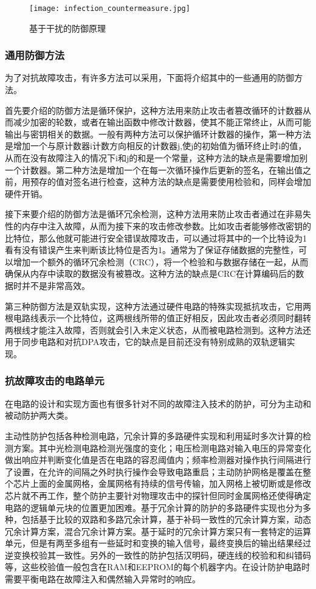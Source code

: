 \documentclass[a4paper,12pt]{article}
\begin{document}
\begin{CJK}{UTF8}{gkai}
\begin{figure}
\centering
\caption{基于干扰的防御原理}
\texttt{[image: infection\_countermeasure.jpg]}
\label{infection_countermeasure}
\end{figure}

\subsubsection{通用防御方法}
为了对抗故障攻击，有许多方法可以采用，下面将介绍其中的一些通用的防御方法。

首先要介绍的防御方法是循环保护，这种方法用来防止攻击者篡改循环的计数器从而减少加密的轮数，或者在输出函数中修改计数器，使其不能正常终止，从而可能输出与密钥相关的数据。一般有两种方法可以保护循环计数器的操作，第一种方法是增加一个与原计数器i计数方向相反的计数器j,使j的初始值为循环终止时i的值，从而在没有故障注入的情况下i和j的和是一个常量，这种方法的缺点是需要增加别一个计数器。第二种方法是增加一个在每一次循环操作后更新的签名，在输出值之前，用预存的值对签名进行检查，这种方法的缺点是需要使用检验和，同样会增加硬件开销。

接下来要介绍的防御方法是循环冗余检测，这种方法用来防止攻击者通过在非易失性的内存中注入故障，从而为接下来的攻击修改参数。比如攻击者能够修改密钥的比特位，那么他就可能进行安全错误故障攻击，可以通过将其中的一个比特设为1看有没有错误产生来判断该比特位是否为1。通常为了保证存储数据的完整性，可以增加一个额外的循环冗余检测（CRC），将一个检验和与数据存储在一起，从而确保从内存中读取的数据没有被篡改。这种方法的缺点是CRC在计算编码后的数据时并不是非常高效。

第三种防御方法是双轨实现，这种方法通过硬件电路的特殊实现抵抗攻击，它用两根电路线表示一个比特位，这两根线所带的值正好相反，因此攻击者必须同时翻转两根线才能注入故障，否则就会引入未定义状态，从而被电路检测到。这种方法还用于同步电路和对抗DPA攻击，它的缺点是目前还没有特别成熟的双轨逻辑实现。



\subsubsection{抗故障攻击的电路单元}
在电路的设计和实现方面也有很多针对不同的故障注入技术的防护，可分为主动和被动防护两大类。

主动性防护包括各种检测电路，冗余计算的多路硬件实现和利用延时多次计算的检测方案。其中光检测电路检测光强度的变化；电压检测电路对输入电压的异常变化做出响应并判断变化值是否在电路的容忍阈值内；频率检测器对操作执行间隔进行了设置，在允许的间隔之外时执行操作会导致电路重启；主动防护网格是覆盖在整个芯片上面的金属网格，金属网格有持续的信号传输，加入网格上被切断或是修改芯片就不再工作，整个防护主要针对物理攻击中的探针但同时金属网格还使得确定电路的逻辑单元块的位置更加困难。基于冗余计算的防护的多路硬件实现也分为多种，包括基于比较的双路和多路冗余计算，基于补码一致性的冗余计算方案，动态冗余计算方案，混合冗余计算方案。基于延时的冗余计算方案只有一套特定的运算单元，但是有两至多组有一些延时和变换的输入信号，最终变换后的输出结果经过逆变换校验其一致性。另外的一致性的防护包括汉明码，硬连线的校验和和纠错码等，这些校验值一般包含在RAM和EEPROM的每个机器字内。在设计防护电路时需要平衡电路在故障注入和偶然输入异常时的响应。


\end{CJK}
\end{document}
